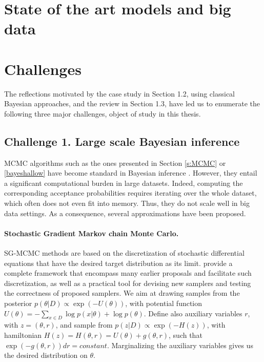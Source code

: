 \section{State of the art models and big data}\label{sec:deep_intro}


\section{Challenges}

The reflections motivated by the case study in Section 1.2, using classical Bayesian approaches, and the review in Section 1.3, have led us to enumerate the following three major challenges, object of study in this thesis.

\subsection{Challenge 1. Large scale Bayesian inference}


MCMC algorithms such as the ones presented in Section \ref{s:MCMC} or \ref{bayeshallow} 
have become standard in Bayesian inference \parencite{french}.
However, they entail a significant computational burden in large datasets. Indeed, 
computing the corresponding acceptance probabilities 
 requires iterating over the whole dataset, which often does not even
 fit into memory. Thus, they 
  do not scale well in big data settings. 
 As a consequence, several approximations have been proposed.

\paragraph{Stochastic Gradient Markov chain Monte Carlo.}\label{bayesdeep} 

SG-MCMC methods are based on the discretization of 
stochastic differential equations that have the desired target 
distribution as its limit. \textcite{ma2015complete} provide a
complete framework that encompass many earlier proposals and
facilitate such discretization, as well as a practical tool for
devising new samplers and testing the correctness of proposed samplers.
We aim at drawing samples from the
posterior $p(\theta |D) \propto \exp(-U(\theta ))$,
with potential function
$U(\theta ) = -\sum _{x\in D} \log p(x|\theta ) + \log p(\theta )$. Define also auxiliary variables $r$,
with $z=( \theta, r )$, and sample from $p(z|D) \propto  \exp(-H(z))$, with hamiltonian
$H(z) = H(\theta , r) = U(\theta ) + g(\theta , r)$, such that
$\exp(-g(\theta , r))dr = constant$. 
Marginalizing the auxiliary variables gives us the desired distribution on $\theta $.

